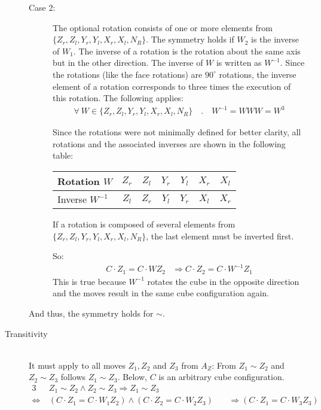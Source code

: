 \begin{description}
\begin{description}
\item[Case 2:]
The optional rotation consists of one or more elements from $\{{Z_r}, {Z_l}, {Y_r}, {Y_l}, {X_r}, {X_l}, N_R\}$.
The symmetry holds if $W_2$ is the inverse of $W_1$. The inverse of a rotation is the rotation about the same axis but in the other direction.
The inverse of $W$ is written as $W^{-1}$.
Since the rotations (like the face rotations) are $90^\circ$ rotations, the inverse element of a rotation corresponds to three times the execution of this rotation.
The following applies:
\begin{align*}
\forall \ W \in \{Z_r, Z_l, Y_r, Y_l, X_r, X_l, N_R\} \quad . \quad W^{-1} = WWW = W^3
\end{align*}

Since the rotations were not minimally defined for better clarity, all rotations and the associated inverses are shown in the following table:

\begin{center}
\begin{tabular}{lcccccc}
Rotation $W$ & ${Z_r}$ & ${Z_l}$ & ${Y_r}$ & ${Y_l}$ & ${X_r}$ & ${X_l}$ \\
\hline
Inverse \hspace*{0.1em} $W^{-1}$ & ${Z_l}$ & ${Z_r}$ & ${Y_l}$ & ${Y_r}$ & ${X_l}$ & ${X_r }$ \\
\end{tabular}
\end{center}


If a rotation is composed of several elements from $\{{Z_r}, {Z_l}, {Y_r}, {Y_l}, {X_r}, {X_l}, N_R\}$, the last element must be inverted first.  

So:
\begin{align*}
C \cdot Z_1 = C \cdot W Z_2 & \Rightarrow C \cdot Z_2 = C \cdot W^{-1} Z_1
\end{align*}
This is true because $W^{-1}$ rotates the cube in the opposite direction and the moves result in the same cube configuration again.

\end{description}

And thus, the symmetry holds for $\sim$.



\item [Transitivity] \ \\
It must apply to all moves $Z_1, Z_2$ and $Z_3$ from $A_Z$: From $Z_1 \sim Z_2$ and $Z_2 \sim Z_3$ follows $Z_1 \sim Z_3$. Below, $C$ is an arbitrary cube configuration.
\begin{alignat*}{3}
& Z_1 \sim Z_2  \wedge Z_2 \sim Z_3  \Rightarrow Z_1 \sim Z_3 \\
\Leftrightarrow \ & (C \cdot Z_1 = C \cdot W_1Z_2) \wedge (C \cdot Z_2 = C \cdot W_2Z_3) \ && \Rightarrow (C \cdot Z_1 = C \cdot W_3Z_3)
\end{alignat*}


\end{description}
